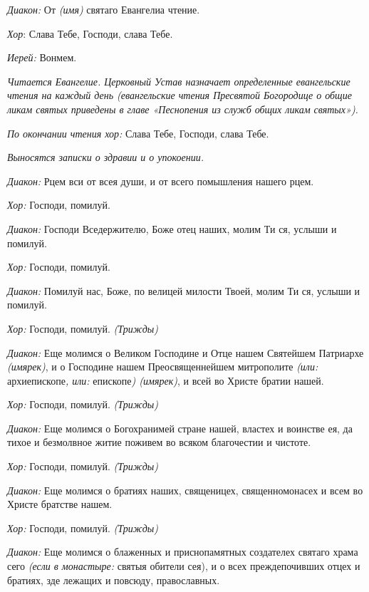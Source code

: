 \begin{mymulticols}
{\itshape Диакон:} От {\itshape (имя)} святаго Евангелиа чтение.

{\itshape Хор}: Слава Тебе, Господи, слава Тебе.

{\itshape Иерей:} Вонмем.


{\itshape Читается Евангелие. Церковный Устав назначает определенные евангельские чтения на каждый день (евангельские чтения Пресвятой Богородице о общие ликам святых приведены в главе «Песнопения из служб общих ликам святых»).}

{\itshape По окончании чтения хор:} Слава Тебе, Господи, слава Тебе.

{\itshape Выносятся записки о здравии и о упокоении.}


{\itshape Диакон:} Рцем вси от всея души, и от всего помышления нашего рцем.

{\itshape Хор:} Господи, помилуй.

{\itshape Диакон:} Господи Вседержителю, Боже отец наших, молим Ти ся, услыши и помилуй.

{\itshape Хор:} Господи, помилуй.

{\itshape Диакон:} Помилуй нас, Боже, по велицей милости Твоей, молим Ти ся, услыши и помилуй.

{\itshape Хор:} Господи, помилуй. {\itshape (Трижды)} 

{\itshape Диакон:} Еще молимся о Великом Господине и Отце нашем Святейшем Патриархе {\itshape (имярек)}, и о Господине нашем Преосвященнейшем митрополите {\itshape (или:} архиепископе{\itshape , или:} епископе{\itshape ) (имярек)}, и всей во Христе братии нашей. 

{\itshape Хор:} Господи, помилуй. {\itshape (Трижды)} 

{\itshape Диакон:} Еще молимся о Богохранимей стране нашей, властех и воинстве ея, да тихое и безмолвное житие поживем во всяком благочестии и чистоте. 

{\itshape Хор:} Господи, помилуй. {\itshape (Трижды)} 

{\itshape Диакон:} Еще молимся о братиях наших, священицех, священномонасех и всем во Христе братстве нашем.

{\itshape Хор:} Господи, помилуй. {\itshape (Трижды)} 

{\itshape Диакон:} Еще молимся о блаженных и приснопамятных создателех святаго храма сего {\itshape (если в монастыре:} святыя обители сея), и о всех преждепочивших отцех и братиях, зде лежащих и повсюду, православных. 


\end{mymulticols}
